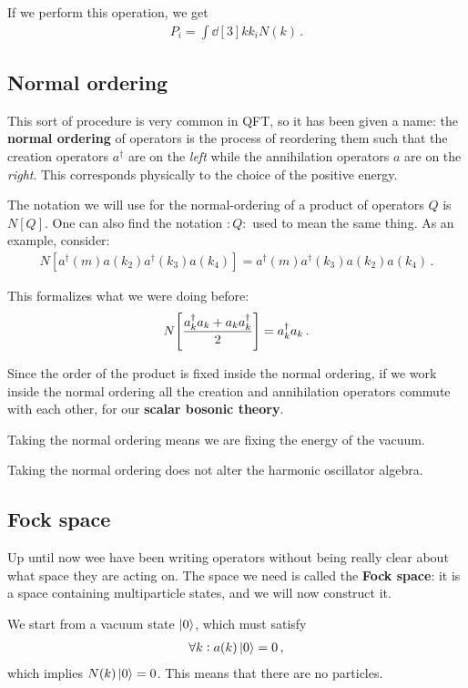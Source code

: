 \documentclass[main.tex]{subfiles}
\begin{document}
If we perform this operation, we get 
%
\begin{align}
P_{i} = \int \dd[3]{k} k_i N(k)
\,.
\end{align}

\subsection{Normal ordering}

This sort of procedure is very common in QFT, so it has been given a name: the \textbf{normal ordering} of operators is the process of reordering them such that the creation operators \(a ^\dag\) are on the \emph{left} while the annihilation operators \(a\) are on the \emph{right}. This corresponds physically to the choice of the positive energy.

The notation we will use for the normal-ordering of a product of operators \(Q\) is \(N[Q]\). One can also find the notation \(: Q :\) used to mean the same thing. 
As an example, consider: 
%
\begin{align}
N[ a ^\dag(m) a(k_2 ) a ^\dag (k_3 ) a (k_4)]
= a ^\dag (m ) a ^\dag (k_3 ) a (k_2  ) a (k_4 )
\,.
\end{align}

This formalizes what we were doing before: 
%
\begin{align}
N \qty[ \frac{a_k ^\dag a_k + a_k a_k ^\dag}{2}] = a_k ^\dag a_k
\,.
\end{align}

Since the order of the product is fixed inside the normal ordering, if we work inside the normal ordering all the creation and annihilation operators commute with each other, for our \textbf{scalar bosonic theory}. 

Taking the normal ordering means we are fixing the energy of the vacuum.

Taking the normal ordering does not alter the harmonic oscillator algebra. 

\subsection{Fock space}

Up until now wee have been writing operators without being really clear about what space they are acting on. 
The space we need is called the \textbf{Fock space}: it is a space containing multiparticle states, and we will now construct it. 

We start from a vacuum state \(\ket{0}\), which must satisfy 
%
\begin{align}
\forall k : 
a(k) \ket{0} = 0
\,,
\end{align}
%
which implies \(N(k) \ket{0} = 0\). This means that there are no particles. 
\end{document}
